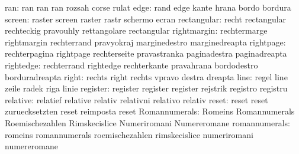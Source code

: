                       ran: ran                       ran
                           ran                       rozsah
                           corse                     rulat
                     edge: rand                      edge
                           kante                     hrana
                           bordo                     bordura
                   screen: raster                    screen
                           raster                    rastr
                           schermo                   ecran
              rectangular: recht                     rectangular
                           rechteckig                pravouhly
                           rettangolare              rectangular
              rightmargin: rechtermarge              rightmargin
                           rechterrand               pravyokraj
                           marginedestro             marginedreapta
                rightpage: rechterpagina             rightpage
                           rechterseite              pravastranka
                           paginadestra              paginadreapta
                rightedge: rechterrand               rightedge
                           rechterkante              pravahrana
                           bordodestro               borduradreapta
                    right: rechts                    right
                           rechts                    vpravo
                           destra                    dreapta
                     line: regel                     line
                           zeile                     radek
                           riga                      linie
                 register: register                  register
                           register                  rejstrik
                           registro                  registru
                 relative: relatief                  relative
                           relativ                   relativni
                           relativo                  relativ
                    reset: reset                     reset
                           zuruecksetzten            reset
                           reimposta                 reset
            Romannumerals: Romeins                   Romannumerals
                           Roemischezahlen           Rimskecislice
                           Numeriromani              Numereromane
            romannumerals: romeins                   romannumerals
                           roemischezahlen           rimskecislice
                           numeriromani              numereromane
